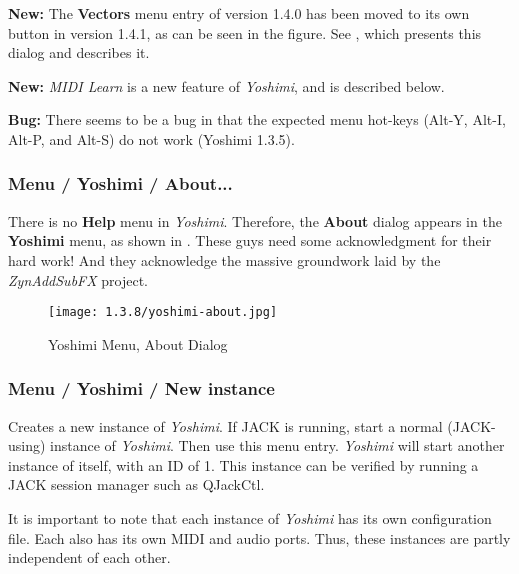    \textbf{New:}
   The \textbf{Vectors} menu entry of version 1.4.0 has been moved to its own
   button in version 1.4.1, as can be seen in the figure.  See
   , which presents this dialog and
   describes it.

   \textbf{New:}
   \textsl{MIDI Learn} is a new feature of \textsl{Yoshimi}, and is described
   below.

   \textbf{Bug:}
   There seems to be a bug in that the expected menu hot-keys
   (Alt-Y, Alt-I, Alt-P, and Alt-S) do not work (Yoshimi 1.3.5).

\subsubsection{Menu / Yoshimi / About...}
\label{subsubsec:menu_yoshimi_about}

   There is no \textbf{Help} menu in \textsl{Yoshimi}.  Therefore, the
   \textbf{About} dialog appears in the \textbf{Yoshimi} menu, as shown in
   .
   These guys need some acknowledgment for their hard work!
   And they acknowledge the massive groundwork laid by the
   \textsl{ZynAddSubFX} project.

\begin{figure}[H]
   \centering 
   \texttt{[image: 1.3.8/yoshimi-about.jpg]}
   \caption{Yoshimi Menu, About Dialog}
   \label{fig:yoshimi_about_dialog}
\end{figure}

\subsubsection{Menu / Yoshimi / New instance}
\label{subsubsec:menu_yoshimi_new_instance}

   Creates a new instance of \textsl{Yoshimi}.
   If JACK is running,
   start a normal (JACK-using) instance of \textsl{Yoshimi}.
   Then use this menu entry.  \textsl{Yoshimi} will start another instance
   of itself, with an ID of 1.
   This instance can be verified by running a JACK session manager such as
   QJackCtl.

   It is important to note that each instance of \textsl{Yoshimi} has its
   own configuration file.  Each also has its own MIDI and audio ports.
   Thus, these instances are partly independent of each other.

